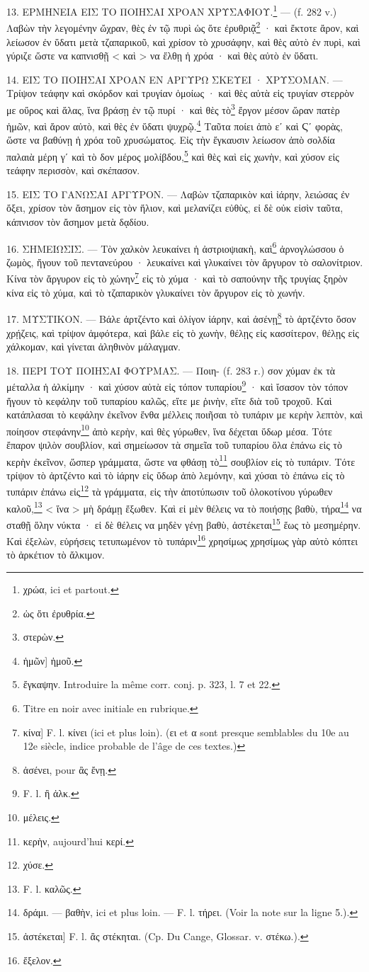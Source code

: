 \documentclass[a4paper, 11pt, oneside, polutonikogreek, french]{article}
\begin{document}
13. ΕΡΜΗΝΕΙΑ ΕΙΣ ΤΟ ΠΟΙΗΣΑΙ ΧΡΟΑΝ ΧΡΥΣΑΦΙΟΥ.\footnote{χρώα, ici et partout.} --- (f. 282 v.) Λαβὼν τὴν λεγομένην ὤχραν, θὲς ἐν τῷ πυρὶ ὡς ὅτε ἐρυθριᾷ\footnote{ὡς ὅτι ἐρυθρία.} · καὶ ἔκτοτε ἄρον, καὶ λείωσον ἐν ὕδατι μετὰ τζαπαρικοῦ, καὶ χρίσον τὸ χρυσάφην, καὶ θὲς αὐτὸ ἐν πυρὶ, καὶ γύριζε ὥστε να καπνισθῇ < καὶ > να ἔλθῃ ἡ χρόα · καὶ θὲς αὐτὸ ἐν ὕδατι.

14. ΕΙΣ ΤΟ ΠΟΙΗΣΑΙ ΧΡΟΑΝ ΕΝ ΑΡΓΥΡΩ ΣΚΕΥΕΙ · ΧΡΥΣΟΜΑΝ. --- Τρίψον τεάφην καὶ σκόρδον καὶ τρυγίαν ὁμοίως · καὶ θὲς αὐτὰ εἰς τρυγίαν στερρὸν με οὔρος καὶ ἅλας, ἵνα βράσῃ ἐν τῷ πυρί · καὶ θὲς τὸ\footnote{στερὼν.} ἔργον μέσον ὥραν πατὲρ ἡμῶν, καὶ ἄρον αὐτὸ, καὶ θὲς ἐν ὕδατι ψυχρῷ.\footnote{ἡμῶν] ἡμοῦ.} Ταῦτα ποίει ἀπὸ εʹ καὶ Ϛʹ φορὰς, ὥστε να βαθύνῃ ἡ χρόα τοῦ χρυσώματος. Εἰς τὴν ἔγκαυσιν λείωσον ἀπὸ σολδία παλαιὰ μέρη γʹ καὶ τὸ δον μέρος μολίβδου,\footnote{ἔγκαψην. Introduire la même corr. conj. p. 323, l. 7 et 22.} καὶ θὲς καὶ εἰς χωνὴν, καὶ χύσον εἰς τεάφην περισσὸν, καὶ σκέπασον.

15. ΕΙΣ ΤΟ ΓΑΝΩΣΑΙ ΑΡΓΥΡΟΝ. --- Λαβὼν τζαπαρικὸν καὶ ἰάρην, λειώσας ἐν ὄξει, χρίσον τὸν ἄσημον εἰς τὸν ἥλιον, καὶ μελανίζει εὐθὺς, εἰ δὲ οὐκ εἰσὶν ταῦτα, κάπνισον τὸν ἄσημον μετὰ δᾳδίου.

16. ΣΗΜΕΙΩΣΙΣ. --- Τὸν χαλκὸν λευκαίνει ἡ ἀστριοψιακὴ, καὶ\footnote{Titre en noir avec initiale en rubrique.} ἀρνογλώσσου ὁ ζωμὸς, ἤγουν τοῦ πεντανεύρου · λευκαίνει καὶ γλυκαίνει τὸν ἄργυρον τὸ σαλονίτριον. Κίνα τὸν ἄργυρον εἰς τὸ χώνην\footnote{κίνα] F. l. κίνει (ici et plus loin). (ει et α sont presque semblables du 10e au 12e siècle, indice probable de l'âge de ces textes.)} εἰς τὸ χύμα · καὶ τὸ σαπούνην τῆς τρυγίας ξηρὸν κίνα εἰς τὸ χύμα, καὶ τὸ τζαπαρικὸν γλυκαίνει τὸν ἄργυρον εἰς τὸ χωνήν.

17. ΜΥΣΤΙΚΟΝ. --- Βάλε ἀρτζέντο καὶ ὀλίγον ἰάρην, καὶ ἀσένῃ\footnote{ἀσένει, pour ἂς ἔνῃ.} τὸ ἀρτζέντο ὅσον χρῄζεις, καὶ τρίψον ἀμφότερα, καὶ βάλε εἰς τὸ χωνὴν, θέλῃς εἰς κασσίτερον, θέλῃς εἰς χάλκομαν, καὶ γίνεται ἀληθινὸν μάλαγμαν.

18. ΠΕΡΙ ΤΟΥ ΠΟΙΗΣΑΙ ΦΟΥΡΜΑΣ. --- Ποιη- (f. 283 r.) σον χύμαν ἐκ τὰ μέταλλα ἡ ἀλκίμην · καὶ χύσον αὐτὰ εἰς τόπον τυπαρίου\footnote{F. l. ἢ ἀλκ.} · καὶ ἴσασον τὸν τόπον ἤγουν τὸ κεφάλην τοῦ τυπαρίου καλῶς, εἴτε με ῥινὴν, εἴτε διὰ τοῦ τροχοῦ. Καὶ κατάπλασαι τὸ κεφάλην ἐκεῖνον ἔνθα μέλλεις ποιῆσαι τὸ τυπάριν με κερὴν λεπτὸν, καὶ ποίησον στεφάνην\footnote{μέλεις.} ἀπὸ κερὴν, καὶ θὲς γύρωθεν, ἵνα δέχεται ὕδωρ μέσα. Τότε ἔπαρον ψιλὸν σουβλίον, καὶ σημείωσον τὰ σημεῖα τοῦ τυπαρίου ὅλα ἐπάνω εἰς τὸ κερὴν ἐκεῖνον, ὥσπερ γράμματα, ὥστε να φθάσῃ τὸ\footnote{κερὴν, aujourd'hui κερί.} σουβλίον εἰς τὸ τυπάριν. Τότε τρίψον τὸ ἀρτζέντο καὶ τὸ ἰάρην εἰς ὕδωρ ἀπὸ λεμόνην, καὶ χύσαι τὸ ἐπάνω εἰς τὸ τυπάριν ἐπάνω εἰς\footnote{χύσε.} τὰ γράμματα, εἰς τὴν ἀποτύπωσιν τοῦ ὁλοκοτίνου γύρωθεν καλοῦ,\footnote{F. l. καλῶς.} < ἵνα > μὴ δράμῃ ἔξωθεν. Καὶ εἰ μὲν θέλεις να τὸ ποιήσῃς βαθὺ, τήρα\footnote{δράμι. --- βαθὴν, ici et plus loin. --- F. l. τήρει. (Voir la note sur la ligne 5.).} να σταθῇ ὅλην νύκτα · εἰ δὲ θέλεις να μηδὲν γένῃ βαθὺ, ἀστέκεται\footnote{ἀστέκεται] F. l. ἂς στέκηται. (Cp. Du Cange, Glossar. v. στέκω.).} ἕως τὸ μεσημέρην. Καὶ ἐξελὼν, εὑρήσεις τετυπωμένον τὸ τυπάριν\footnote{ἔξελον.} χρησίμως χρησίμως γὰρ αὐτὸ κόπτει τὸ ἀρκέτιον τὸ ἄλκιμον.
\end{document}
